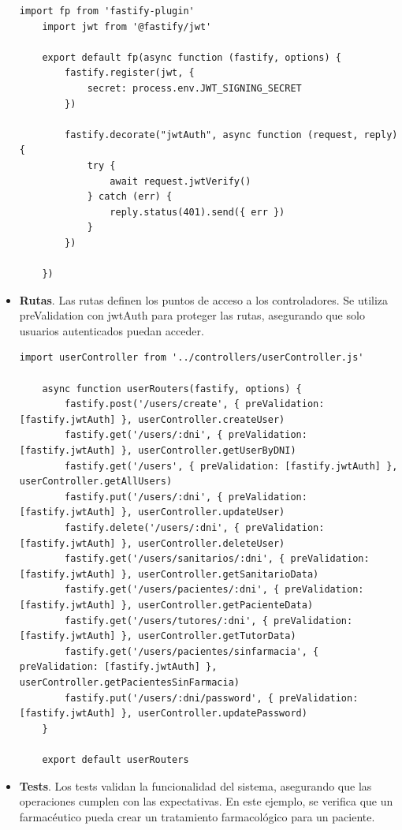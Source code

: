 \begin{itemize}
\begin{lstlisting}[caption={Plugin para JWT}, label={lst:pluginJWT}]
	import fp from 'fastify-plugin'
	import jwt from '@fastify/jwt'
	
	export default fp(async function (fastify, options) {
		fastify.register(jwt, {
			secret: process.env.JWT_SIGNING_SECRET
		})
		
		fastify.decorate("jwtAuth", async function (request, reply) {
			try {
				await request.jwtVerify()
			} catch (err) {
				reply.status(401).send({ err })
			}
		})
		
	})
\end{lstlisting}

\item \textbf{Rutas}. Las rutas definen los puntos de acceso a los controladores. Se utiliza preValidation con jwtAuth para proteger las rutas, asegurando que solo usuarios autenticados puedan acceder.

\begin{lstlisting}[caption={Definición de rutas para usuarios}, label={lst:userRoutes}]
	import userController from '../controllers/userController.js'
	
	async function userRouters(fastify, options) {
		fastify.post('/users/create', { preValidation: [fastify.jwtAuth] }, userController.createUser)               
		fastify.get('/users/:dni', { preValidation: [fastify.jwtAuth] }, userController.getUserByDNI)         
		fastify.get('/users', { preValidation: [fastify.jwtAuth] }, userController.getAllUsers)               
		fastify.put('/users/:dni', { preValidation: [fastify.jwtAuth] }, userController.updateUser)          
		fastify.delete('/users/:dni', { preValidation: [fastify.jwtAuth] }, userController.deleteUser)        
		fastify.get('/users/sanitarios/:dni', { preValidation: [fastify.jwtAuth] }, userController.getSanitarioData) 
		fastify.get('/users/pacientes/:dni', { preValidation: [fastify.jwtAuth] }, userController.getPacienteData)   
		fastify.get('/users/tutores/:dni', { preValidation: [fastify.jwtAuth] }, userController.getTutorData)  
		fastify.get('/users/pacientes/sinfarmacia', { preValidation: [fastify.jwtAuth] }, userController.getPacientesSinFarmacia)
		fastify.put('/users/:dni/password', { preValidation: [fastify.jwtAuth] }, userController.updatePassword)
	}
	
	export default userRouters
\end{lstlisting}
\newpage

\item \textbf{Tests}. Los tests validan la funcionalidad del sistema, asegurando que las operaciones cumplen con las expectativas. En este ejemplo, se verifica que un farmacéutico pueda crear un tratamiento farmacológico para un paciente.


\end{itemize}
